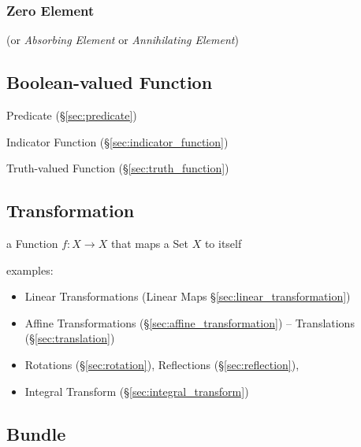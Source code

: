\subsubsection{Zero Element}\label{sec:zero_element}

(or \emph{Absorbing Element} or \emph{Annihilating Element})



\subsection{Boolean-valued Function}\label{sec:boolean_function}

Predicate (\S\ref{sec:predicate})

Indicator Function (\S\ref{sec:indicator_function})

Truth-valued Function (\S\ref{sec:truth_function})



\subsection{Transformation}\label{sec:transformation}

a Function $f : X \rightarrow X$ that maps a Set $X$ to itself

examples:

\begin{itemize}
  \item Linear Transformations (Linear Maps \S\ref{sec:linear_transformation})
  \item Affine Transformations (\S\ref{sec:affine_transformation}) --
    Translations (\S\ref{sec:translation})
  \item Rotations (\S\ref{sec:rotation}), Reflections (\S\ref{sec:reflection}),
  \item Integral Transform (\S\ref{sec:integral_transform})
\end{itemize}



\subsection{Bundle}\label{sec:bundle}

